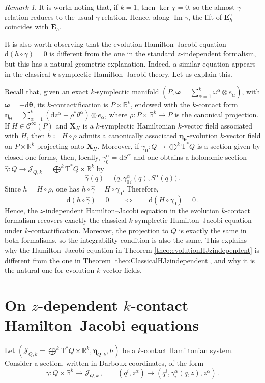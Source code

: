 \documentclass[11pt,twoside]{article}
\theoremstyle{plain}
\theoremstyle{definition}
\theoremstyle{remark}
\newtheorem{remark}[theorem]{Remark}
\newcommand{\dd}{\mathrm{d}}
\renewcommand{\d}{\mathrm{d}}
\newcommand{\Cinfty}{\mathscr{C}^\infty}
\newcommand{\T}{\mathrm{T}}
\newcommand{\cT}{\mathrm{T}^\ast}
\DeclareMathOperator{\Ima}{Im}
\begin{document}
\begin{remark}
It is worth noting that, if \(k=1\), then \(\ker\chi=0\), so the almost \(\gamma\)-relation reduces to the usual \(\gamma\)-relation. Hence, along \(\Ima\gamma\), the lift of \(\mathbf E_h^\gamma\) coincides with \(\mathbf E_h\).

It is also worth observing that the evolution Hamilton--Jacobi equation \(\dd(h\circ\gamma)=0\) is different from the one in the standard \(z\)-independent formalism, but this has a natural geometric explanation. Indeed, a similar equation appears in the classical \(k\)-symplectic Hamilton--Jacobi theory. Let us explain this.

Recall that, given an exact \(k\)-symplectic manifold \((P,\bm\omega=\sum_{\alpha=1}^k\omega^\alpha\otimes e_\alpha)\), with \(\bm\omega=-\dd\bm\theta\), its \(k\)-contactification is \(P\times \mathbb{R}^k\), endowed with the \(k\)-contact form \(\bm\eta_{\bm \theta}=\sum_{\alpha=1}^k(\d z^\alpha-\rho^*\theta^\alpha)\otimes e_\alpha\), where \(\rho\colon P\times\mathbb{R}^k\to P\) is the canonical projection. If \(H\in \Cinfty(P)\) and \(\mathbf X_H\) is a \(k\)-symplectic Hamiltonian \(k\)-vector field associated with \(H\), then \(h\coloneqq H\circ\rho\) admits a canonically associated \(\bm\eta_{\bm\theta}\)-evolution \(k\)-vector field on \(P\times\mathbb{R}^k\) projecting onto \(\mathbf X_H\). Moreover, if \(\gamma_0:Q\to \bigoplus^k\T^*Q\) is a section given by closed one-forms, then, locally, \(\gamma_0^\alpha=\dd S^\alpha\) and one obtains a holonomic section \(\widehat\gamma\colon Q\to \mathcal J_{Q,k}=\bigoplus^k\T^*Q\times\mathbb{R}^k\) by
\[
\widehat\gamma(q)=\bigl(q,\gamma_{0\,i}^\alpha(q),S^\alpha(q)\bigr)\,.
\]
Since \(h=H\circ\rho\), one has \(h\circ \widehat\gamma = H\circ \gamma_0\). Therefore,
\[
\dd(h\circ \widehat\gamma)=0 \qquad\Longleftrightarrow\qquad \dd(H\circ \gamma_0)=0\,.
\]
Hence, the \(z\)-independent Hamilton--Jacobi equation in the evolution \(k\)-contact formalism recovers exactly the classical \(k\)-symplectic Hamilton--Jacobi equation under \(k\)-contactification. Moreover, the projection to $Q$ is exactly the same in both formalisms, so the integrability condition is also the same. This explains why the Hamilton--Jacobi equation in Theorem \ref{theo:evolutionHJzindependent} is different from the one in Theorem \ref{theo:ClassicalHJzindependent}, and why it is the natural one for evolution \(k\)-vector fields.
\end{remark}  


\section{On \texorpdfstring{$z$}{}-dependent \texorpdfstring{$k$}{}-contact Hamilton--Jacobi equations}\label{sec:HJzdependent}
Let \((\mathcal{J}_{Q,k}=\bigoplus^k\cT Q\times\mathbb{R}^k,{\bm \eta}_{Q,k},h)\) be a $k$-contact Hamiltonian system. Consider a section, written in Darboux coordinates, of the form
\[
\gamma\colon Q\times\mathbb{R}^k\longrightarrow \mathcal{J}_{Q,k}\,,\qquad
(q^i,z^\alpha)\longmapsto (q^i,\gamma_i^\alpha(q,z),z^\alpha)\,.
\]
\end{document}
